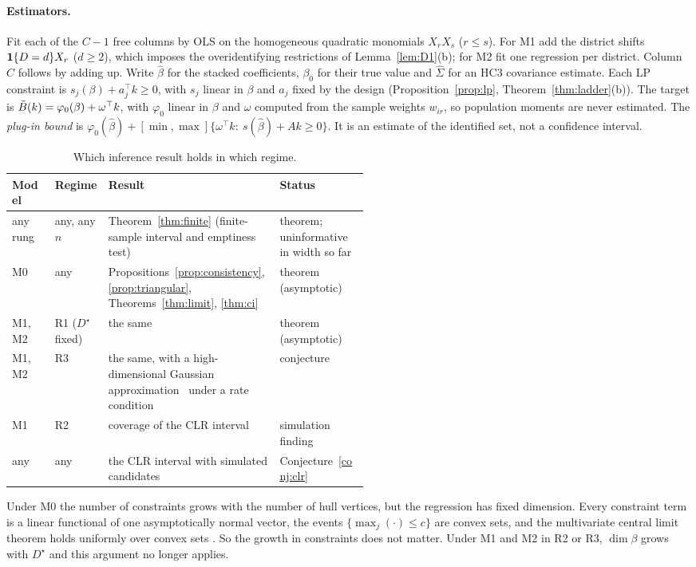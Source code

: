 \paragraph{Estimators.} Fit each of the $C-1$ free columns by OLS on the
homogeneous quadratic monomials $X_rX_s$ ($r\le s$). For M1 add the district shifts
$\mathbf 1\{D=d\}X_r$ ($d\ge2$), which imposes the overidentifying restrictions of
Lemma~\ref{lem:D1}(b); for M2 fit one regression per district. Column $C$ follows
by adding up. Write $\hat\beta$ for the stacked coefficients, $\beta_0$ for their
true value and $\hat\Sigma$ for an HC3 covariance estimate. Each LP constraint is
$s_j(\beta)+a_j^\top k\ge0$, with $s_j$ linear in $\beta$ and $a_j$ fixed by the
design (Proposition~\ref{prop:lp}, Theorem~\ref{thm:ladder}(b)). The target is
$\tilde B(k)=\varphi_0(\beta)+\omega^\top k$, with $\varphi_0$ linear in $\beta$ and
$\omega$ computed from the sample weights $w_{ir}$, so population moments are
never estimated. The \emph{plug-in bound} is
$\varphi_0(\hat\beta)+[\min,\max]\{\omega^\top k:\ s(\hat\beta)+Ak\ge0\}$. It is an
estimate of the identified set, not a confidence interval.

\begin{table}[t]
\centering\small
\begin{tabularx}{\linewidth}{@{}L{0.12\linewidth}L{0.15\linewidth}Y L{0.25\linewidth}@{}}
\toprule
Model & Regime & Result & Status \\
\midrule
any rung & any, any $n$ & Theorem~\ref{thm:finite} (finite-sample interval and emptiness test) & theorem; uninformative in width so far \\
M0 & any & Propositions~\ref{prop:consistency}, \ref{prop:triangular}, Theorems~\ref{thm:limit}, \ref{thm:ci} & theorem (asymptotic) \\
M1, M2 & R1 ($D^\star$ fixed) & the same & theorem (asymptotic) \\
M1, M2 & R3 & the same, with a high-dimensional Gaussian approximation~\citep{cck2017} under a rate condition & conjecture \\
M1 & R2 & coverage of the CLR interval & simulation finding \\
any & any & the CLR interval with simulated candidates & Conjecture~\ref{conj:clr} \\
\bottomrule
\end{tabularx}
\caption{Which inference result holds in which regime.}\label{tab:regimes}
\end{table}

Under M0 the number of constraints grows with the number of hull vertices, but
the regression has fixed dimension. Every constraint term is a linear functional
of one asymptotically normal vector, the events $\{\max_j(\cdot)\le c\}$ are convex
sets, and the multivariate central limit theorem holds uniformly over convex sets
\citep[Theorem~17.5]{bhattacharyarao1976}. So the growth in constraints does not
matter. Under M1 and M2 in R2 or R3, $\dim\beta$ grows with $D^\star$ and this
argument no longer applies.

